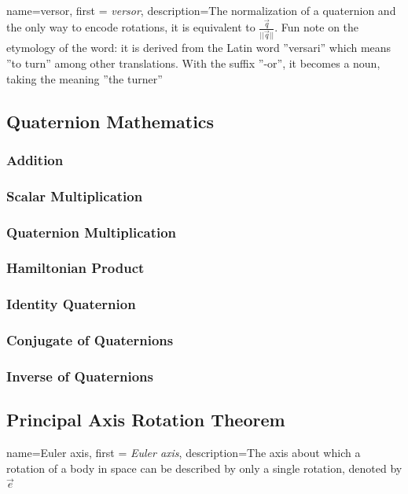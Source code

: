 \documentclass[12pt]{report}
\begin{document}
{
    name=versor,
    first = {\textit{versor}},
    description={The normalization of a quaternion and the only way to encode rotations, it is equivalent to $\frac{\vec{q}}{||\vec{q}||}$. Fun note on the etymology of the word: it is derived from the Latin word ''versari'' which means ''to turn'' among other translations. With the suffix ''-or'', it becomes a noun, taking the meaning ''the turner''}
}

\subsection{Quaternion Mathematics}

\subsubsection{Addition}

\subsubsection{Scalar Multiplication}

\subsubsection{Quaternion Multiplication}

\subsubsection{Hamiltonian Product}

\subsubsection{Identity Quaternion}

\subsubsection{Conjugate of Quaternions}

\subsubsection{Inverse of Quaternions}





\subsection{Principal Axis Rotation Theorem}
{
    name=Euler axis,
    first = {\textit{Euler axis}},
    description={The axis about which a rotation of a body in space can be described by only a single rotation, denoted by $\vec{e}$}
}
\end{document}
